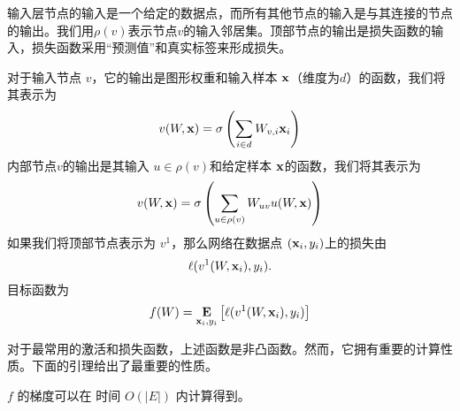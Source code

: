 输入层节点的输入是一个给定的数据点，而所有其他节点的输入是与其连接的节点的输出。我们用$\rho(v)$表示节点$v$的输入邻居集。顶部节点的输出是损失函数的输入，损失函数采用“预测值”和真实标签来形成损失。

对于输入节点 $v$，它的输出是图形权重和输入样本 $\mathbf x$（维度为$d$）的函数，我们将其表示为
$$ v(W,\mathbf x) = \sigma \left( \sum_{i \in d} W_{v,i} \mathbf x_i \right) $$
内部节点$v$的输出是其输入 $u \in \rho(v)$和给定样本 $\mathbf x$的函数，我们将其表示为
$$ v( W,\mathbf x ) = \sigma  \left(  \sum_{u \in \rho(v)}  W_{uv} u(W,\mathbf x) \right)  $$
如果我们将顶部节点表示为 $v^{1}$，那么网络在数据点 $(\mathbf x_i,y_i)$上的损失由
$$ \ell(   v^{1} (W,\mathbf x_i) , y_i ) . $$
目标函数为
$$f(W) =  \mathop{\mbox{\bf E}}_{\mathbf x_i,y_i} \left[ \ell( v^{1} (W,\mathbf x_i) , y_i)  \right]  $$

对于最常用的激活和损失函数，上述函数是非凸函数。然而，它拥有重要的计算性质。下面的引理给出了最重要的性质。
\begin{lemma}
$f$ 的梯度可以在 时间 $O(|E|)$ 内计算得到。
\end{lemma}


